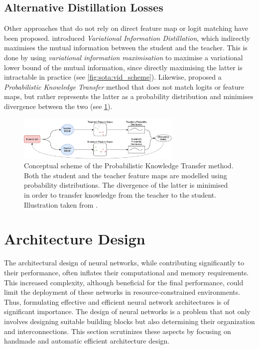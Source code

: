 \subsection{Alternative Distillation Losses}
Other approaches that do not rely on direct feature map or logit matching have
been proposed. \cite{DBLP:conf/cvpr/AhnHDLD19} introduced \emph{Variational
  Information Distillation}, which indirectly maximises the mutual information
between the student and the teacher. This is done by using \emph{variational
  information maximisation} \cite{barber2004algorithm} to maximise a variational
lower bound of the mutual information, since directly maximising the latter is
intractable in practice (see \cref{fig:sota:vid_scheme}). Likewise,
\cite{DBLP:conf/eccv/PassalisT18} proposed a \emph{Probabilistic Knowledge
  Transfer} method that does not match logits or feature maps, but rather
represents the latter as a probability distribution and minimises divergence
between the two (see \cref{fig:sota:pkt_scheme}).\\


\begin{figure}[htbp]
  \centering
  \includegraphics[width=0.7\textwidth]{chapter_sota/assets/pkt_diagram.pdf}
  \caption{Conceptual scheme of the Probabilistic Knowledge Transfer method.
    Both the student and the teacher feature maps are modelled using probability
    distributions. The divergence of the latter is minimised in order to
    transfer knowledge from the teacher to the student. Illustration taken from
    \cite{DBLP:conf/eccv/PassalisT18}.}
  \label{fig:sota:pkt_scheme}
\end{figure}

\section{Architecture Design}\label{sec:sota:archi_design}

The architectural design of neural networks, while contributing significantly to
their performance, often inflates their computational and memory requirements.
This increased complexity, although beneficial for the final performance, could
limit the deployment of these networks in resource-constrained environments.
Thus, formulating effective and efficient neural network architectures is of
significant importance. The design of neural networks is a problem that not only
involves designing suitable building blocks but also determining their
organization and interconnections. This section scrutinizes these aspects by
focusing on handmade and automatic efficient architecture design.\\

